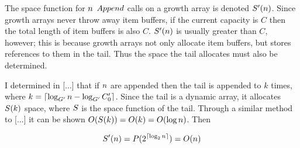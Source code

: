 \HdrSpaceComplex

The space function for $n$ $Append$ calls on a growth array is denoted $S'(n)$. Since growth arrays never throw away item buffers, if the current capacity is $C$ then the total length of item buffers is also $C$. $S'(n)$ is usually greater than $C$, however; this is because growth arrays not only allocate item buffers, but stores references to them in the tail. Thus the space the tail allocates must also be determined.

I determined in [...] that if $n$ are appended then the tail is appended to $k$ times, where $k = \lceil \log_{G'} n - \log_{G'} C_0' \rceil$. Since the tail is a dynamic array, it allocates $S(k)$ space, where $S$ is the space function of the tail. Through a similar method to [...] it can be shown $O(S(k)) = O(k) = O(\log n)$. Then %

\begin{align*}
S'(n) = P(2^{\lceil \log_2 n \rceil}) = O(n)
\end{align*}